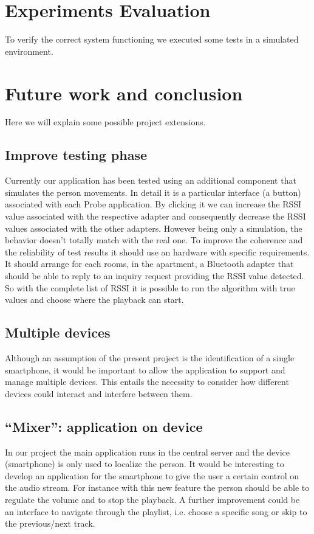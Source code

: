 \documentclass[conference]{IEEEtran}
\begin{document}
\section{Experiments Evaluation}
To verify the correct system functioning we executed some tests in a simulated environment.

\section{Future work and conclusion}
Here we will explain some possible project extensions.

\subsection{Improve testing phase}
Currently our application has been tested using an additional component that simulates the person movements. In detail it is a particular interface (a button) associated with each Probe application. By clicking it we can increase the RSSI value associated with the respective adapter and consequently decrease the RSSI values associated with the other adapters. However being only a simulation, the behavior doesn't totally match  with the real one. To improve the coherence and the reliability of test results it should use an hardware with specific requirements. It should arrange for each rooms, in the apartment, a Bluetooth adapter that should be able to reply to an inquiry request providing the RSSI value detected. So with the complete list of RSSI it is possible to run the algorithm with true values and choose where the playback can start.

\subsection{Multiple devices}
Although an assumption of the present project is the identification of a single smartphone, it would be important to allow the application to support and manage multiple devices. This entails the necessity to consider how different devices could interact and interfere between them.

\subsection{``Mixer'': application on device}
In our project the main application runs in the central server and the device (smartphone) is only used to localize the person. It would be interesting to develop an application for the smartphone to give the user a certain control on the audio stream. For instance with this new feature the person should be able to regulate the volume and to stop the playback. A further improvement could be an interface to navigate through the playlist, i.e. choose a specific song or skip to the previous/next track.
\end{document}

